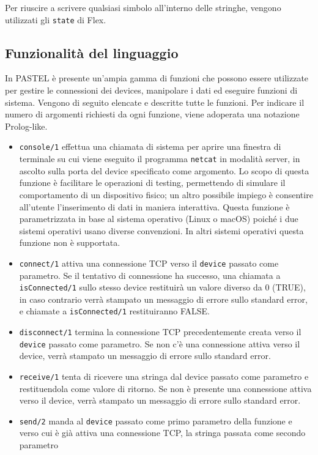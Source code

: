 \documentclass[10pt]{article}
\begin{document}
Per riuscire a scrivere qualsiasi simbolo all'interno delle stringhe, vengono utilizzati gli \texttt{state} di Flex.

\subsection{Funzionalità del linguaggio}\label{subsection:fun}
In PASTEL è presente un'ampia gamma di funzioni che possono essere utilizzate per gestire le connessioni dei devices, manipolare i dati ed eseguire funzioni di sistema. Vengono di seguito elencate e descritte tutte le funzioni. Per indicare il numero di argomenti richiesti da ogni funzione, viene adoperata una notazione Prolog-like.
\begin{itemize}
\item \texttt{console/1} effettua una chiamata di sistema per aprire una finestra di terminale su cui viene eseguito il programma \texttt{netcat} in modalità server, in ascolto sulla porta del device specificato come argomento. Lo scopo di questa funzione è facilitare le operazioni di testing, permettendo di simulare il comportamento di un dispositivo fisico; un altro possibile impiego è consentire all'utente l'inserimento di dati in maniera interattiva. Questa funzione è parametrizzata in base al sistema operativo (Linux o macOS) poiché i due sistemi operativi usano diverse convenzioni. In altri sistemi operativi questa funzione non è supportata.
\item \texttt{connect/1} attiva una connessione TCP verso il \texttt{device} passato come parametro. Se il tentativo di connessione ha successo, una chiamata a \texttt{isConnected/1} sullo stesso device restituirà un valore diverso da 0 (TRUE), in caso contrario verrà stampato un messaggio di errore sullo standard error, e chiamate a \texttt{isConnected/1} restituiranno FALSE.
\item \texttt{disconnect/1} termina la connessione TCP precedentemente creata verso il \texttt{device} passato come parametro. Se non c'è una connessione attiva verso il device, verrà stampato un messaggio di errore sullo standard error.
\item \texttt{receive/1} tenta di ricevere una stringa dal device passato come parametro e restituendola come valore di ritorno. Se non è presente una connessione attiva verso il device, verrà stampato un messaggio di errore sullo standard error. 
\item \texttt{send/2} manda al \texttt{device} passato come primo parametro della funzione e verso cui è già attiva una connessione TCP, la stringa passata come secondo parametro

\end{itemize}
\end{document}
